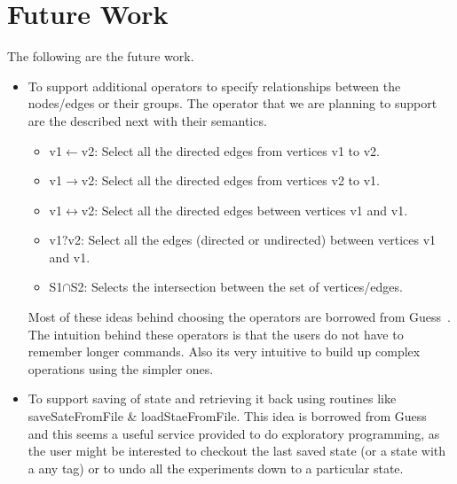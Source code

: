 \documentclass[12,twoside]{article}
\begin{document}
\section{Future Work}
The following are the future work.
  \begin{itemize}
    \item To support  additional operators to specify relationships between the 
    nodes/edges or their groups. The operator that we are planning to support 
    are the described next with their semantics.

    \begin{itemize}
      \item v1$\leftarrow$v2: Select all the directed edges from vertices v1 to 
      v2.
      \item v1$\rightarrow$v2: Select all the directed edges from vertices v2 to 
      v1.
      \item v1$\leftrightarrow$v2: Select all the directed edges between 
      vertices v1 and v1.
      \item v1$?$v2: Select all the edges (directed or undirected) between 
      vertices v1 and v1.
      \item S1$\cap$S2: Selects the intersection between the set of
      vertices/edges.
    \end{itemize}
      Most of these ideas behind choosing the operators are borrowed from 
      Guess~\cite{Adar}. The intuition behind these operators is that the users do 
      not have to remember longer commands. Also its very intuitive to build up 
      complex operations using the simpler ones.

    \item To support saving of state and retrieving it back using
    routines like saveSateFromFile \& loadStaeFromFile.
    This idea is borrowed from Guess~\cite{Adar} and this seems a useful service 
    provided to do exploratory programming, as the user might be interested to 
    checkout the last saved state  (or a state with a any tag) or to undo all 
    the experiments down to a particular state.

  \end{itemize}
\end{document}
